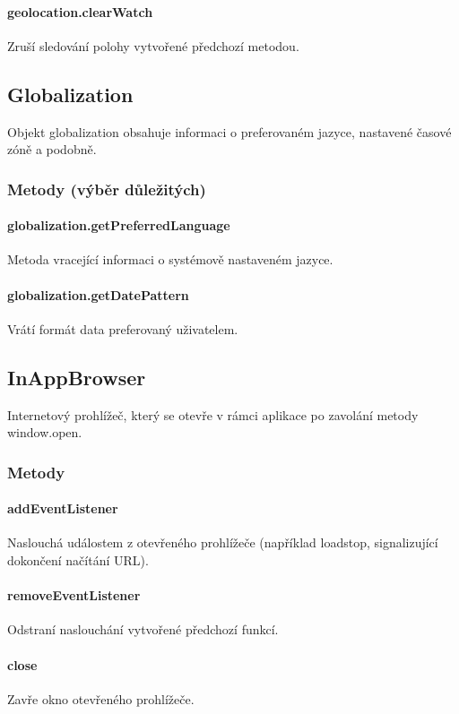 \paragraph{geolocation.clearWatch}
Zruší sledování polohy vytvořené předchozí metodou.

\subsection{Globalization}
Objekt globalization obsahuje informaci o preferovaném jazyce, nastavené časové zóně a podobně.

\subsubsection{Metody (výběr důležitých)}
\paragraph{globalization.getPreferredLanguage}
Metoda vracející informaci o systémově nastaveném jazyce.

\paragraph{globalization.getDatePattern}
Vrátí formát data preferovaný uživatelem.

\subsection{InAppBrowser}
Internetový prohlížeč, který se otevře v rámci aplikace po zavolání metody window.open.

\subsubsection{Metody}
\paragraph{addEventListener}
Naslouchá událostem z otevřeného prohlížeče (například loadstop, signalizující dokončení načítání URL).

\paragraph{removeEventListener}
Odstraní naslouchání vytvořené předchozí funkcí.

\paragraph{close}
Zavře okno otevřeného prohlížeče.


